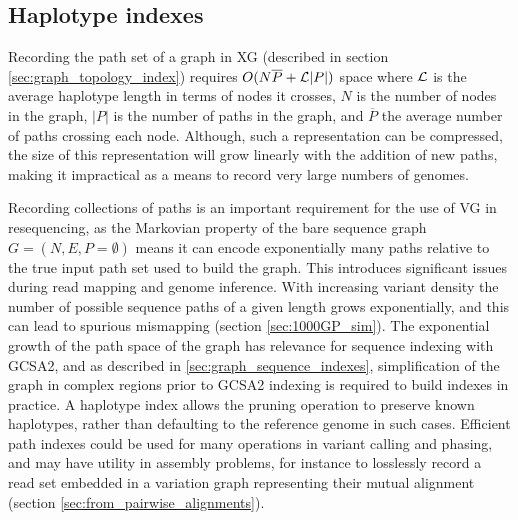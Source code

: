 
\subsection{Haplotype indexes}
Recording the path set of a graph in XG (described in section \ref{sec:graph_topology_index}) requires $O(N\overline{P} + {\cal L}|P|)$ space where ${\cal L}$ is the average haplotype length in terms of nodes it crosses, $N$ is the number of nodes in the graph, $|P|$ is the number of paths in the graph, and $\overline{P}$ the average number of paths crossing each node.
Although, such a representation can be compressed, the size of this representation will grow linearly with the addition of new paths, making it impractical as a means to record very large numbers of genomes.

Recording collections of paths is an important requirement for the use of VG in resequencing, as the Markovian property of the bare sequence graph $G = (N, E, P= \emptyset)$ means it can encode exponentially many paths relative to the true input path set used to build the graph.
This introduces significant issues during read mapping and genome inference.
With increasing variant density the number of possible sequence paths of a given length grows exponentially, and this can lead to spurious mismapping (section \ref{sec:1000GP_sim}).
The exponential growth of the path space of the graph has relevance for sequence indexing with GCSA2, and as described in \ref{sec:graph_sequence_indexes}, simplification of the graph in complex regions prior to GCSA2 indexing is required to build indexes in practice.
A haplotype index allows the pruning operation to preserve known haplotypes, rather than defaulting to the reference genome in such cases.
Efficient path indexes could be used for many operations in variant calling and phasing, and may have utility in assembly problems, for instance to losslessly record a read set embedded in a variation graph representing their mutual alignment (section \ref{sec:from_pairwise_alignments}).

